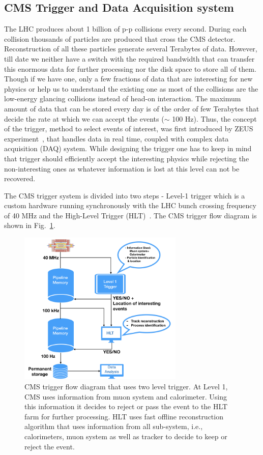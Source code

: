 \subsection{CMS Trigger and Data Acquisition system} %
\label{sub:cms_trigger_and_data_acquisition_system}
The LHC produces about 1 billion of p-p collisions every second. During each collision thousands of particles are produced that cross the CMS detector. Reconstruction of all these particles generate several Terabytes of data. However, till date we neither have a switch with the required bandwidth that can transfer this enormous data for further processing nor the disk space to store all of them. Though if we have one, only a few fractions of data that are interesting for new physics or help us to understand the existing one as most of the collisions are the low-energy glancing collisions instead of head-on interaction. The maximum amount of data that can be stored every day is of the order of few Terabytes that decide the rate at which we can accept the events ($\sim$ 100 Hz). Thus, the concept of the trigger, method to select events of interest, was first introduced by ZEUS experiment~\cite{ZEUSCollaboration1993}, that handles data in real time, coupled with complex data acquisition (DAQ) system. While designing the trigger one has to keep in mind that trigger should efficiently accept the interesting physics  while rejecting the non-interesting ones as whatever information is lost at this level can not be recovered.


The CMS trigger system is divided into two steps - Level-1 trigger which is a custom hardware running synchronously with the LHC bunch crossing frequency of 40 MHz and the High-Level Trigger (HLT)~\cite{paper:JINST:CMSCollaboration,Cittolin:578006,Khachatryan2017}. The CMS trigger flow diagram is shown in Fig.~\ref{fig:cms-trigger}. 
\begin{figure}[!htbp]
	\centering
	\includegraphics[width=0.70\textwidth,height=0.53\textwidth]{figures/LHC/Trigger-flow-diagram.jpeg}
	\caption{CMS trigger flow diagram that uses two level trigger. At Level 1, CMS uses information from muon system and calorimeter. Using this information it decides to reject  or pass the event to the HLT farm for further processing. HLT uses fast offline reconstruction algorithm that uses information from all sub-system, i.e., calorimeters, muon system as well as tracker to decide to keep or reject the event.}
	\label{fig:cms-trigger}
\end{figure}

